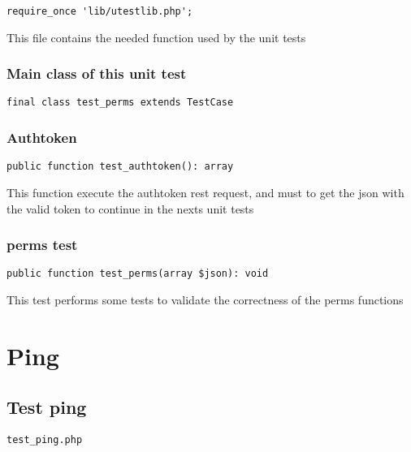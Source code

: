 \documentclass[a4paper]{article}
\begin{document}
\begin{lstlisting}
require_once 'lib/utestlib.php';
\end{lstlisting}

This file contains the needed function used by the unit tests

\hypertarget{toc330}{}
\subsubsection{Main class of this unit test}

\begin{lstlisting}
final class test_perms extends TestCase
\end{lstlisting}

\hypertarget{toc331}{}
\subsubsection{Authtoken}

\begin{lstlisting}
public function test_authtoken(): array
\end{lstlisting}

This function execute the authtoken rest request, and must to get the
json with the valid token to continue in the nexts unit tests

\hypertarget{toc332}{}
\subsubsection{perms test}

\begin{lstlisting}
public function test_perms(array $json): void
\end{lstlisting}

This test performs some tests to validate the correctness
of the perms functions


\hypertarget{toc333}{}
\section{Ping}

\hypertarget{toc334}{}
\subsection{Test ping}

\begin{lstlisting}
test_ping.php
\end{lstlisting}
\end{document}

